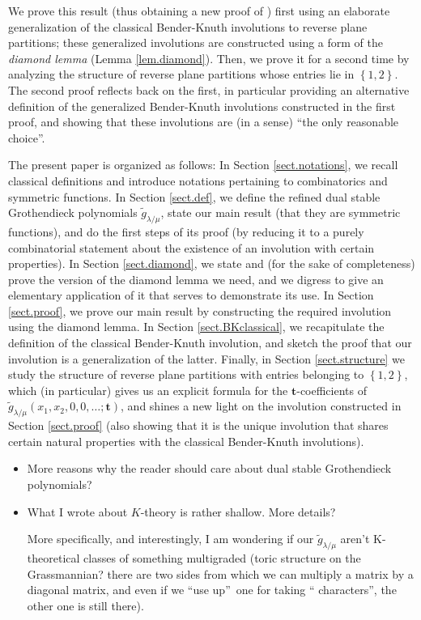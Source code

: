 \documentclass[numbers=enddot,12pt,final,onecolumn,notitlepage]{scrartcl}%
\theoremstyle{definition}
\newenvironment{todo}{}{}
\begin{document}
We prove this result (thus obtaining a new proof of \cite[Theorem 9.1]%
{LamPyl}) first using an elaborate generalization of the classical
Bender-Knuth involutions to reverse plane partitions; these generalized
involutions are constructed using a form of the \textit{diamond lemma} (Lemma
\ref{lem.diamond}).
Then, we prove it for a second time by analyzing the structure of reverse
plane partitions whose entries lie in $\left\{1, 2\right\}$. The second
proof reflects back on the first, in particular providing an
alternative definition of the generalized Bender-Knuth involutions
constructed in the first proof, and showing that these involutions
are (in a sense) ``the only reasonable choice''.

The present paper is organized as follows: In Section \ref{sect.notations}, we
recall classical definitions and introduce notations pertaining to
combinatorics and symmetric functions. In Section \ref{sect.def}, we define
the refined dual stable Grothendieck polynomials $\widetilde{g}_{\lambda/\mu}$, state
our main result (that they are symmetric functions), and do the first steps of
its proof (by reducing it to a purely combinatorial statement about the
existence of an involution with certain properties). In Section
\ref{sect.diamond}, we state and (for the sake of completeness) prove the
version of the diamond lemma we need, and we digress to give an elementary
application of it that serves to demonstrate its use. In Section
\ref{sect.proof}, we prove our main result by constructing the required
involution using the diamond lemma. In Section \ref{sect.BKclassical}, we
recapitulate the definition of the classical Bender-Knuth involution, and
sketch the proof that our involution is a generalization of the latter.
Finally, in Section \ref{sect.structure} we study the structure of
reverse plane partitions with entries belonging to $\left\{1, 2\right\}$,
which (in particular) gives us an explicit formula for the
$\mathbf{t}$-coefficients of
$\widetilde{g}_{\lambda/\mu}(x_1,x_2,0,0,\dots;\mathbf{t})$,
and shines a new light on the involution constructed in
Section \ref{sect.proof}
(also showing that it is the unique involution that shares certain natural
properties with the classical Bender-Knuth involutions).

\begin{todo}
\begin{itemize}
\item More reasons why the reader should
care about dual stable Grothendieck polynomials?

\item What I wrote about $K$-theory is rather shallow. More details?

More specifically, and interestingly, I am wondering if our $\widetilde{g}%
_{\lambda/\mu}$ aren't K-theoretical classes of something multigraded (toric
structure on the Grassmannian? there are two sides from which we can multiply
a matrix by a diagonal matrix, and even if we \textquotedblleft use
up\textquotedblright\ one for taking \textquotedblleft
characters\textquotedblright, the other one is still there).
\end{itemize}
\end{todo}
\end{document}
